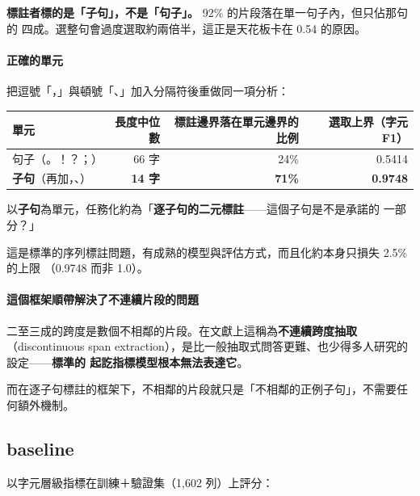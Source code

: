 \documentclass[11pt,a4paper]{ctexart}
\begin{document}
\textbf{標註者標的是「子句」，不是「句子」。} 92\% 的片段落在單一句子內，但只佔那句的
四成。選整句會過度選取約兩倍半，這正是天花板卡在 0.54 的原因。

\paragraph{正確的單元}

把逗號「，」與頓號「、」加入分隔符後重做同一項分析：

\begin{table}[h]
\centering\small
\begin{tabular}{@{}lrrr@{}}
\toprule
單元 & 長度中位數 & 標註邊界落在單元邊界的比例 & 選取上界（字元 F1） \\
\midrule
句子（。！？；） & 66 字 & 24\% & 0.5414 \\
\rowcolor{green!12}
\textbf{子句}（再加，、） & \textbf{14 字} & \textbf{71\%} & \textbf{0.9748} \\
\bottomrule
\end{tabular}
\end{table}

\begin{tcolorbox}[colback=green!5, colframe=green!45, title=任務定義的建議]
以\textbf{子句}為單元，任務化約為「\textbf{逐子句的二元標註}——這個子句是不是承諾的
一部分？」

\medskip
這是標準的序列標註問題，有成熟的模型與評估方式，而且化約本身只損失 2.5\% 的上限
（0.9748 而非 1.0）。
\end{tcolorbox}

\paragraph{這個框架順帶解決了不連續片段的問題}

二至三成的跨度是數個不相鄰的片段。在文獻上這稱為\textbf{不連續跨度抽取}（discontinuous
span extraction），是比一般抽取式問答更難、也少得多人研究的設定——\textbf{標準的
起訖指標模型根本無法表達它}。

而在逐子句標註的框架下，不相鄰的片段就只是「不相鄰的正例子句」，不需要任何額外機制。

\subsection{baseline}

以字元層級指標在訓練＋驗證集（1{,}602 列）上評分：
\end{document}
